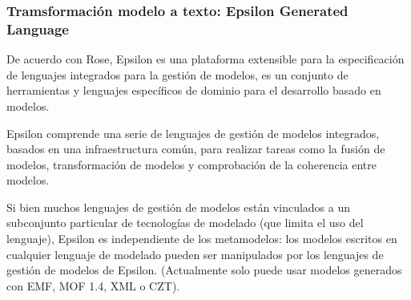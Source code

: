 \subsubsection*{Tramsformación modelo a texto: Epsilon Generated Language}

De acuerdo con Rose\cite{rose_epsilon_2008}, Epsilon es una plataforma extensible para la especificación de lenguajes integrados para la gestión de modelos, es un conjunto de herramientas y lenguajes específicos de dominio para el desarrollo basado en modelos. 


Epsilon comprende una serie de lenguajes de gestión de modelos integrados, basados en una infraestructura común, para realizar tareas como la fusión de modelos, transformación de modelos y comprobación de la coherencia entre modelos. 


Si bien muchos lenguajes de gestión de modelos están vinculados a un subconjunto particular de tecnologías de modelado (que limita el uso del lenguaje), Epsilon es independiente de los metamodelos: los modelos escritos en cualquier lenguaje de modelado pueden ser manipulados por los lenguajes de gestión de modelos de Epsilon. (Actualmente solo puede usar modelos generados con EMF, MOF 1.4, XML o CZT).